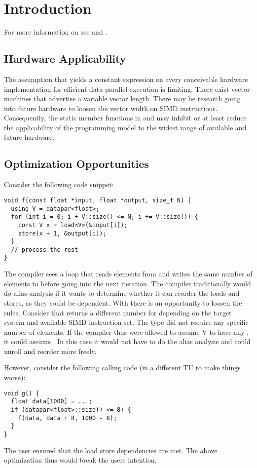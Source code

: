 \section{Introduction}

For more information on \datapar see \cite{P0214R0} and \cite{Kretz2015}.

\subsection{Hardware Applicability}
The assumption that \datapar[<T>::size()] yields a constant expression on every conceivable hardware implementation for efficient data parallel execution is limiting.
There exist vector machines that advertise a variable vector length.
There may be research going into future hardware to loosen the vector width on SIMD instructions.
Consequently, the static member functions  in \datapar and \mask may inhibit or at least reduce the applicability of the programming model to the widest range of available and future hardware.

\subsection{Optimization Opportunities}
Consider the following code snippet:
\smallskip\begin{lstlisting}[style=Vc]
void f(const float *input, float *output, size_t N) {
  using V = datapar<float>;
  for (int i = 0; i + V::size() <= N; i += V::size()) {
    const V x = load<V>(&input[i]);
    store(x + 1, &output[i]);
  }
  // process the rest
}
\end{lstlisting}
The compiler sees a loop that reads  elements from  and writes the same number of elements to  before going into the next iteration.
The compiler traditionally would do alias analysis if it wants to determine whether it can reorder the loads and stores, as they could be dependent.
With \datapar there is an opportunity to loosen the rules.
Consider that \datapar[<float>] returns a different number for  depending on the target system and available SIMD instruction set.
The type did not require any specific number of elements.
If the compiler thus were allowed to assume \type V to have any , it could assume .
In this case it would not have to do the alias analysis and could unroll and reorder more freely.

However, consider the following calling code (in a different TU to make things worse):
\smallskip \begin{lstlisting}[style=Vc]
void g() {
  float data[1000] = ...;
  if (datapar<float>::size() <= 8) {
    f(data, data + 8, 1000 - 8);
  }
}
\end{lstlisting}
The user ensured that the load store dependencies are met.
The above optimization thus would break the users intention.

